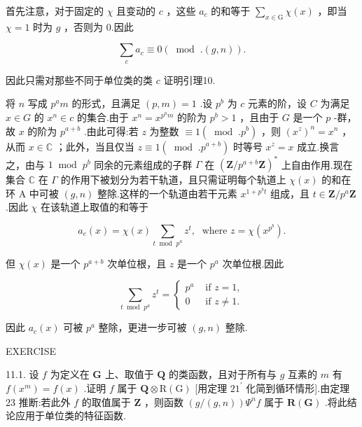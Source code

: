 \documentclass[10pt]{article}
\begin{document}
首先注意，对于固定的 \(\chi\) 且变动的 \(c\) ，这些 \({a}_{c}\) 的和等于 \(\mathop{\sum }\limits_{{x \in  \mathrm{G}}}\chi \left( x\right)\) ，即当 \(\chi  = 1\) 时为 \(g\) ，否则为 0.因此

\[
\mathop{\sum }\limits_{c}{a}_{c} \equiv  0\left( {{\;\operatorname{mod}\;.}\left( {g,n}\right) }\right) .
\]

因此只需对那些不同于单位类的类 \(c\) 证明引理10.

将 \(n\) 写成 \({p}^{a}m\) 的形式，且满足 \(\left( {p,m}\right)  = 1\) .设 \({p}^{b}\) 为 \(c\) 元素的阶，设 \(C\) 为满足 \(x \in  G\) 的 \({x}^{n} \in  c\) 的集合.由于 \({x}^{n} = {x}^{{p}^{a}m}\) 的阶为 \({p}^{b} > 1\) ，且由于 \(G\) 是一个 \(p\) -群，故 \(x\) 的阶为 \({p}^{a + b}\) .由此可得:若 \(z\) 为整数 \(\equiv  1\left( {\;\operatorname{mod}\;.{p}^{b}}\right)\) ，则 \({\left( {x}^{z}\right) }^{n} = {x}^{n}\) ，从而 \(x \in  \mathbb{C}\) ；此外，当且仅当 \(z \equiv  1\left( {{\;\operatorname{mod}\;.}{p}^{a + b}}\right)\) 时等号 \({x}^{z} = x\) 成立.换言之，由与 \(1{\;\operatorname{mod}\;{p}^{b}}\) 同余的元素组成的子群 \(\Gamma\) 在 \({\left( \mathbf{Z}/{p}^{a + b}\mathbf{Z}\right) }^{ * }\) 上自由作用.现在集合 \(\mathbb{C}\) 在 \(\Gamma\) 的作用下被划分为若干轨道，且只需证明每个轨道上 \(\chi \left( x\right)\) 的和在环 A 中可被 \(\left( {g,n}\right)\) 整除.这样的一个轨道由若干元素 \({x}^{1 + {p}^{b}t}\) 组成，且 \(t \in  \mathbf{Z}/{p}^{a}\mathbf{Z}\) .因此 \(\chi\) 在该轨道上取值的和等于

\[
{a}_{c}\left( x\right)  = \chi \left( x\right) \mathop{\sum }\limits_{{t{\;\operatorname{mod}\;{p}^{a}}}}{z}^{t},\;\text{ where }z = \chi \left( {x}^{{p}^{b}}\right) .
\]

但 \(\chi \left( x\right)\) 是一个 \({p}^{a + b}\) 次单位根，且 \(z\) 是一个 \({p}^{a}\) 次单位根.因此

\[
\mathop{\sum }\limits_{{t{\;\operatorname{mod}\;{p}^{a}}}}{z}^{t} = \left\{  \begin{array}{ll} {p}^{a} & \text{ if }z = 1, \\  0 & \text{ if }z \neq  1. \end{array}\right.
\]

因此 \({a}_{c}\left( x\right)\) 可被 \({p}^{a}\) 整除，更进一步可被 \(\left( {g,n}\right)\) 整除.

EXERCISE

11.1. 设 \(f\) 为定义在 \(\mathbf{G}\) 上、取值于 \(\mathbf{Q}\) 的类函数，且对于所有与 \(g\) 互素的 \(m\) 有 \(f\left( {x}^{m}\right)  = f\left( x\right)\) .证明 \(f\) 属于 \(\mathbf{Q} \otimes  \mathrm{R}\left( \mathrm{G}\right)\) [用定理 \(2{1}^{\prime }\) 化简到循环情形].由定理 23 推断:若此外 \(f\) 的取值属于 \(\mathbf{Z}\) ，则函数 \(\left( {g/\left( {g,n}\right) }\right) {\Psi }^{n}f\) 属于 \(\mathbf{R}\left( \mathbf{G}\right)\) .将此结论应用于单位类的特征函数.
\end{document}
